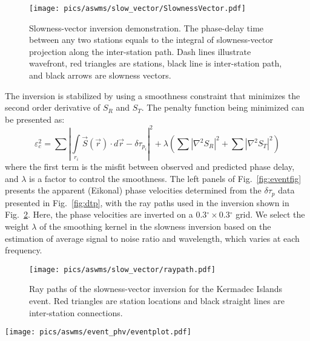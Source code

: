 \begin{figure}
	\center
	\texttt{[image: pics/aswms/slow\_vector/SlownessVector.pdf]}
	\caption{Slowness-vector inversion demonstration. The phase-delay time between any two stations equals to the integral of slowness-vector projection along the inter-station path. Dash lines illustrate wavefront, red triangles are stations, black line is inter-station path, and black arrows are slowness vectors.}
	\label{fig:slowvector}
\end{figure}

The inversion is stabilized by using a smoothness constraint that minimizes the second order derivative of $S_R$ and $S_T$. The penalty function being minimized can be presented as:
\begin{equation}
	\varepsilon_{c}^2 = \sum \left| \int\limits_{r_i} \vec{S}(\vec{r}) \cdot d\vec{r} - \delta \tau_{p_i}\right|^2 + \lambda \left( \sum |\nabla^2 S_R|^2 + \sum |\nabla^2 S_T|^2 \right)
\end{equation}
where the first term is the misfit between observed and predicted phase delay, and $\lambda$ is a factor to control the smoothness. The left panels of Fig.~\ref{fig:eventfig} presents the apparent (Eikonal) phase velocities determined from the $\delta \tau_p$ data presented in Fig.~\ref{fig:dtp}, with the ray paths used in the inversion shown in Fig.~\ref{fig:raypath}.    
Here, the phase velocities are inverted on a 0.3$^\circ \times$0.3$^\circ$ grid. We select the weight $\lambda$ of the smoothing kernel in the slowness inversion based on the estimation of average signal to noise ratio and wavelength, which varies at each frequency.

\begin{figure}
	\center
	\texttt{[image: pics/aswms/slow\_vector/raypath.pdf]}
	\caption{Ray paths of the slowness-vector inversion for the Kermadec Islands event. Red triangles are station locations and black straight lines are inter-station connections.}
	\label{fig:raypath}
\end{figure}

\begin{figure*}
	\texttt{[image: pics/aswms/event\_phv/eventplot.pdf]}
	\caption{The 40-s Rayleigh-wave results of two different events. \textbf{a)} The apparent phase-velocity map derived from phase-delay measurements (Fig.~\ref{fig:dtp}) for the Kermadec Islands event. \textbf{b)} The corrected phase-velocity map derived from the apparent phase velocity and amplitude measurements via Helmholtz equation. \textbf{c)} The amplitude map. \textbf{d)} The map of the propagation direction anomalies. Arrows demonstrate the propagation direction while the color map illustrates the angle differing from the great-circle direction. The rotation of the arrows from great-circle direction is exaggerated for demonstration. \textbf{e)}-\textbf{h)} Same as a)-d) but for the April 7, 2009 earthquake near Kuril Islands ($M_s=6.8$).}
	\label{fig:eventfig}
\end{figure*}

